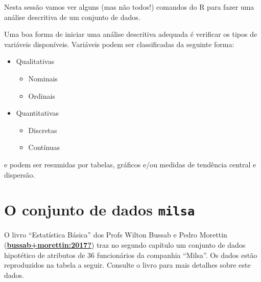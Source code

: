 \documentclass[
  10pt,
  a4paper]{book}
\providecommand{\tightlist}{%
  \setlength{\itemsep}{0pt}\setlength{\parskip}{0pt}}
\begin{document}
Nesta sessão vamos ver alguns (mas não todos!) comandos do R para fazer
uma análise descritiva de um conjunto de dados.

Uma boa forma de iniciar uma análise descritiva adequada é verificar os
tipos de variáveis disponíveis. Variáveis podem ser classificadas da
seguinte forma:

\begin{itemize}
\tightlist
\item
  Qualitativas

  \begin{itemize}
  \tightlist
  \item
    Nominais
  \item
    Ordinais
  \end{itemize}
\item
  Quantitativas

  \begin{itemize}
  \tightlist
  \item
    Discretas
  \item
    Contínuas
  \end{itemize}
\end{itemize}

e podem ser resumidas por tabelas, gráficos e/ou medidas de tendência central e dispersão.

\hypertarget{o-conjunto-de-dados-milsa}{%
\section{\texorpdfstring{O conjunto de dados \texttt{milsa}}{O conjunto de dados milsa}}\label{o-conjunto-de-dados-milsa}}

O livro ``Estatística Básica'' dos Profs Wilton Bussab e Pedro Morettin (\protect\hyperlink{ref-bussab+morettin:2017}{\textbf{bussab+morettin:2017?}}) traz no
segundo capítulo um conjunto de dados hipotético de atributos de 36 funcionários da companhia ``Milsa''.
Os dados estão reproduzidos na tabela a seguir.
Consulte o livro para mais detalhes sobre este dados.
\end{document}
